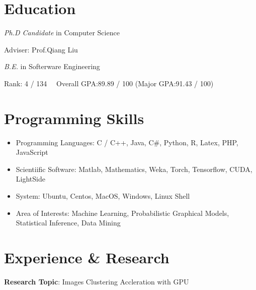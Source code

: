 \documentclass{resume}
\begin{document}




% 
% 
\section{Education}


\textit{Ph.D Candidate} in Computer Science

Adviser: Prof.Qiang Liu \ \ 


\textit{B.E.} in Softerware Engineering

Rank: 4 / 134 \ \  Overall GPA:89.89 / 100 (Major GPA:91.43 / 100)




\section{Programming Skills}
\begin{itemize}[parsep=0.5ex]
  \item Programming Languages: C / C++, Java, C\#, Python, R, Latex, PHP, JavaScript
  \item Scientiific Software: Matlab, Mathematics, Weka, Torch, Tensorflow, CUDA, LightSide
  \item System: Ubuntu, Centos, MacOS, Windows, Linux Shell
  \item Area of Interests: Machine Learning, Probabilistic Graphical Models, Statistical Inference, Data Mining
\end{itemize}



%
%



\section{Experience \& Research}

\textbf{Research Topic}: Images Clustering Accleration with GPU 
\end{document}
